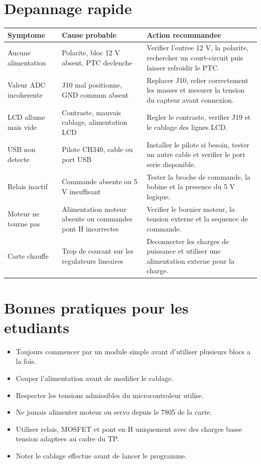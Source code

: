 \documentclass[11pt,a4paper]{article}
\begin{document}
\section{Depannage rapide}
{\small
\begin{tabularx}{\textwidth}{@{}L{4.3cm}L{4.9cm}Y@{}}
\toprule
{}
\textbf{Symptome} & \textbf{Cause probable} & \textbf{Action recommandee} \\
\midrule
Aucune alimentation & Polarite, bloc 12 V absent, PTC declenche & Verifier l'entree 12 V, la polarite, rechercher un court-circuit puis laisser refroidir le PTC. \\
Valeur ADC incoherente & J10 mal positionne, GND commun absent & Replacer J10, relier correctement les masses et mesurer la tension du capteur avant connexion. \\
LCD allume mais vide & Contraste, mauvais cablage, alimentation LCD & Regler le contraste, verifier J19 et le cablage des lignes LCD. \\
USB non detecte & Pilote CH340, cable ou port USB & Installer le pilote si besoin, tester un autre cable et verifier le port serie disponible. \\
Relais inactif & Commande absente ou 5 V insuffisant & Tester la broche de commande, la bobine et la presence du 5 V logique. \\
Moteur ne tourne pas & Alimentation moteur absente ou commandes pont H incorrectes & Verifier le bornier moteur, la tension externe et la sequence de commande. \\
Carte chauffe & Trop de courant sur les regulateurs lineaires & Deconnecter les charges de puissance et utiliser une alimentation externe pour la charge. \\
\bottomrule
\end{tabularx}}

\section{Bonnes pratiques pour les etudiants}
\begin{itemize}
\item Toujours commencer par un module simple avant d'utiliser plusieurs blocs a la fois.
\item Couper l'alimentation avant de modifier le cablage.
\item Respecter les tensions admissibles du microcontroleur utilise.
\item Ne jamais alimenter moteur ou servo depuis le 7805 de la carte.
\item Utiliser relais, MOSFET et pont en H uniquement avec des charges basse tension adaptees au cadre du TP.
\item Noter le cablage effectue avant de lancer le programme.
\end{itemize}
\end{document}
